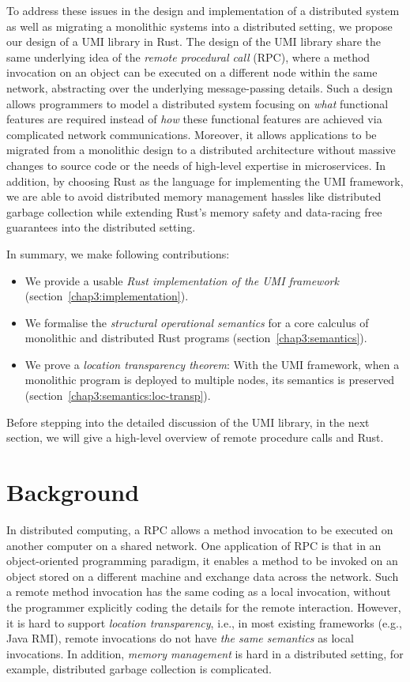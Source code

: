 To address these issues in the design and implementation of a distributed system as well as migrating a monolithic systems into a distributed setting, we propose our design of a UMI library in Rust. The design of the UMI library share the same underlying idea of the \emph{remote procedural call} (RPC), where a method invocation on an object can be executed on a different node within the same network, abstracting over the underlying message-passing details. Such a design allows programmers to model a distributed system focusing on \emph{what} functional features are required instead of \emph{how} these functional features are achieved via complicated network communications. Moreover, it allows applications to be migrated from a monolithic design to a distributed architecture without massive changes to source code or the needs of high-level expertise in microservices. In addition, by choosing Rust as the language for implementing the UMI framework, we are able to avoid distributed memory management hassles like distributed garbage collection while extending Rust's memory safety and data-racing free guarantees into the distributed setting.

In summary, we make following contributions:
\begin{itemize}
    \item We provide a usable \emph{Rust implementation of the UMI framework} (section~\ref{chap3:implementation}).
    \item We formalise the \emph{structural operational semantics} for a core calculus of monolithic and distributed Rust programs (section~\ref{chap3:semantics}).
    \item We prove a \emph{location transparency theorem}: With the UMI framework, when a monolithic program is deployed to multiple nodes, its semantics is preserved (section~\ref{chap3:semantics:loc-transp}).
\end{itemize}

Before stepping into the detailed discussion of the UMI library, in the next section, we will give a high-level overview of remote procedure calls and Rust.

\section{Background}
\label{chap3:background}
In distributed computing, a RPC allows a method invocation to be executed on another computer on a shared network. One application of RPC is that in an object-oriented programming paradigm, it enables a method to be invoked on an object stored on a different machine and exchange data across the network. Such a remote method invocation has the same coding as a local invocation, without the programmer explicitly coding the details for the remote interaction.
However, it is hard to support \emph{location transparency}, i.e., in most existing frameworks (e.g., Java RMI), remote invocations do not have \emph{the same semantics} as local invocations. In addition, \emph{memory management} is hard in a distributed setting, for example, distributed garbage collection is complicated.

